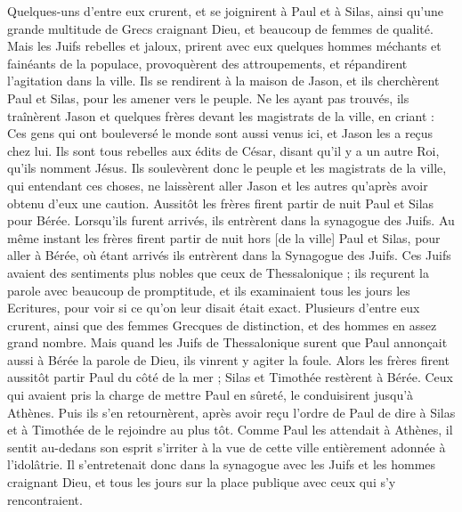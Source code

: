 \begin{multicols}{2}
Quelques-uns d'entre eux crurent, et se joignirent à Paul et à Silas, ainsi qu’une grande multitude de Grecs craignant Dieu, et beaucoup de femmes de qualité.
Mais les Juifs rebelles et jaloux, prirent avec eux quelques hommes méchants et fainéants de la populace, provoquèrent des attroupements, et répandirent l’agitation dans la ville. Ils se rendirent à la maison de Jason, et ils cherchèrent Paul et Silas, pour les amener vers le peuple.
Ne les ayant pas trouvés, ils traînèrent Jason et quelques frères devant les magistrats de la ville, en criant : Ces gens qui ont bouleversé le monde sont aussi venus ici, et Jason les a reçus chez lui.
Ils sont tous rebelles aux édits de César, disant qu'il y a un autre Roi, qu'ils nomment Jésus.
Ils soulevèrent donc le peuple et les magistrats de la ville, qui entendant ces choses,
ne laissèrent aller Jason et les autres qu’après avoir obtenu d’eux une caution. Aussitôt les frères firent partir de nuit Paul et Silas pour Bérée. Lorsqu’ils furent arrivés, ils entrèrent dans la synagogue des Juifs.
Au même instant les frères firent partir de nuit hors [de la ville] Paul et Silas, pour aller à Bérée, où étant arrivés ils entrèrent dans la Synagogue des Juifs.
Ces Juifs avaient des sentiments plus nobles que ceux de Thessalonique ; ils reçurent la parole avec beaucoup de promptitude, et ils examinaient tous les jours les Ecritures, pour voir si ce qu’on leur disait était exact.
Plusieurs d'entre eux crurent, ainsi que des femmes Grecques de distinction, et des hommes en assez grand nombre.
Mais quand les Juifs de Thessalonique surent que Paul annonçait aussi à Bérée la parole de Dieu, ils vinrent y agiter la foule.
Alors les frères firent aussitôt partir Paul du côté de la mer ; Silas et Timothée restèrent à Bérée.
Ceux qui avaient pris la charge de mettre Paul en sûreté, le conduisirent jusqu'à Athènes. Puis ils s’en retournèrent, après avoir reçu l’ordre de Paul de dire à Silas et à Timothée de le rejoindre au plus tôt.
Comme Paul les attendait à Athènes, il sentit au-dedans son esprit s’irriter à la vue de cette ville entièrement adonnée à l'idolâtrie.
Il s’entretenait donc dans la synagogue avec les Juifs et les hommes craignant Dieu, et tous les jours sur la place publique avec ceux qui s'y rencontraient.

\end{multicols}
